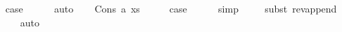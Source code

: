 \begin{isabellebody}
\ \isamarkupfalse%
\ {\isacharquery}{\kern0pt}case\isanewline
\ \ \ \ \isamarkupfalse%
\ auto\isanewline
{}\isamarkupfalse%
\isanewline
\ \ \isamarkupfalse%
\ {\isacharparenleft}{\kern0pt}Cons\ a\ xs{\isacharparenright}{\kern0pt}\isanewline
\ \ \isamarkupfalse%
\ \isamarkupfalse%
\ {\isacharquery}{\kern0pt}case\isanewline
\ \ \ \ \isamarkupfalse%
\ simp\isanewline
\ \ \ \ \isamarkupfalse%
{\isacharparenleft}{\kern0pt}subst\ rev{\isacharprime}{\kern0pt}{\isacharunderscore}{\kern0pt}append{\isacharparenright}{\kern0pt}\isanewline
\ \ \ \ \isamarkupfalse%
\ auto\isanewline
{}\isamarkupfalse%
%
\endisatagproof
{\isafoldproof}%
%
\isadelimproof
\isanewline
%
\endisadelimproof
\isanewline
\isanewline
%
\isadelimtheory
\isanewline
%
\endisadelimtheory
%
\isatagtheory
{}\isamarkupfalse%
%
\endisatagtheory
{\isafoldtheory}%
%
\isadelimtheory
%
\endisadelimtheory
%
\end{isabellebody}%
\endinput
